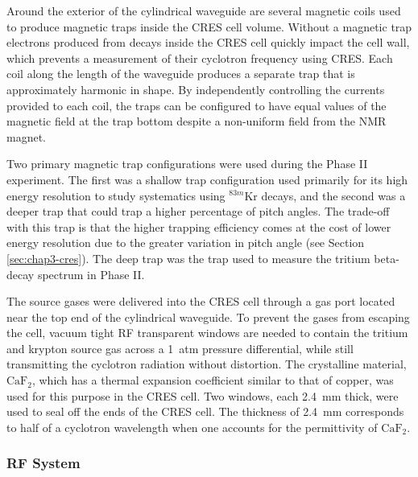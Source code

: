 Around the exterior of the cylindrical waveguide are several magnetic coils used to produce magnetic traps inside the CRES cell volume. Without a magnetic trap electrons produced from decays inside the CRES cell quickly impact the cell wall, which prevents a measurement of their cyclotron frequency using CRES. Each coil along the length of the waveguide produces a separate trap that is approximately harmonic in shape. By independently controlling the currents provided to each coil, the traps can be configured to have equal values of the magnetic field at the trap bottom despite a non-uniform field from the NMR magnet. 

Two primary magnetic trap configurations were used during the Phase II experiment. The first was a shallow trap configuration used primarily for its high energy resolution to study systematics using $^{83m}$Kr decays, and the second was a deeper trap that could trap a higher percentage of pitch angles. The trade-off with this trap is that the higher trapping efficiency comes at the cost of lower energy resolution due to the greater variation in pitch angle (see Section \ref{sec:chap3-cres}). The deep trap was the trap used to measure the tritium beta-decay spectrum in Phase II.

The source gases were delivered into the CRES cell through a gas port located near the top end of the cylindrical waveguide. To prevent the gases from escaping the cell, vacuum tight RF transparent windows are needed to contain the tritium and krypton source gas across a 1~atm pressure differential, while still transmitting the cyclotron radiation without distortion. The crystalline material, $\mathrm{CaF}_2$, which has a thermal expansion coefficient similar to that of copper, was used for this purpose in the CRES cell. Two windows, each 2.4~mm thick, were used to seal off the ends of the CRES cell. The thickness of 2.4~mm corresponds to half of a cyclotron wavelength when one accounts for the permittivity of $\mathrm{CaF}_2$.

\subsubsection*{RF System}

